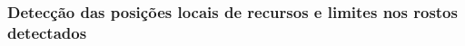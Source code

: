 \documentclass{beamer}
\begin{document}
\begin{frame}
\frametitle{Detecção das posições locais de recursos e limites nos rostos detectados}
\begin{figure}[h]
\centering
{}
\end{figure}

\end{frame}

\end{document}
